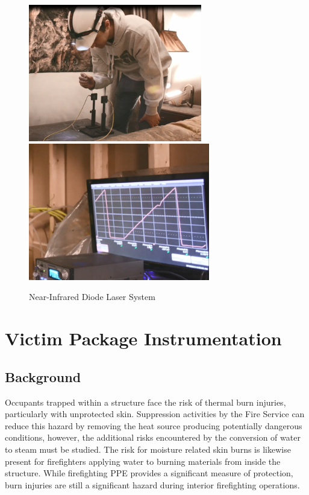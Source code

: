 \documentclass[12pt,oneside]{book}
\begin{document}
\begin{figure}[H]
	\centering
	\includegraphics[height = 2.35in]{0_Images/Instrumentation/Laser1}
	\includegraphics[height = 2.35in]{0_Images/Instrumentation/Laser2}
	\caption{Near-Infrared Diode Laser System}
	\label{fig:Laser}
\end{figure}

\clearpage

\section{Victim Package Instrumentation}

\subsection{Background}
Occupants trapped within a structure face the risk of thermal burn injuries, particularly with unprotected skin.  Suppression activities by the Fire Service can reduce this hazard by removing the heat source producing potentially dangerous conditions, however, the additional risks encountered by the conversion of water to steam must be studied.  The risk for moisture related skin burns is likewise present for firefighters applying water to burning materials from inside the structure.  While firefighting PPE provides a significant measure of protection, burn injuries are still a significant hazard during interior firefighting operations.
\end{document}
